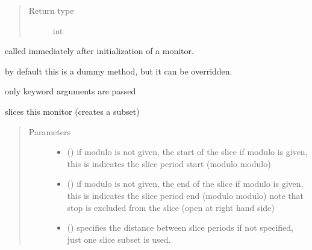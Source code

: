 \documentclass[letterpaper,10pt,english]{sphinxmanual}
\begin{document}
\begin{fulllineitems}
\begin{fulllineitems}
\begin{quote}
\begin{description}
\item[{Return type}] \leavevmode
int

\end{description}\end{quote}

\end{fulllineitems}


\begin{fulllineitems}
\label{\detokenize{Reference:salabim.Monitor.setup}}
called immediately after initialization of a monitor.

by default this is a dummy method, but it can be overridden.

only keyword arguments are passed

\end{fulllineitems}


\begin{fulllineitems}
\label{\detokenize{Reference:salabim.Monitor.slice}}
slices this monitor (creates a subset)
\begin{quote}\begin{description}
\item[{Parameters}] \leavevmode\begin{itemize}
\item {} 
 () \textendash{} if modulo is not given, the start of the slice 
if modulo is given, this is indicates the slice period start (modulo modulo)

\item {} 
 () \textendash{} if modulo is not given, the end of the slice 
if modulo is given, this is indicates the slice period end (modulo modulo) 
note that stop is excluded from the slice (open at right hand side)

\item {} 
 () \textendash{} specifies the distance between slice periods 
if not specified, just one slice subset is used.


\end{itemize}
\end{description}
\end{quote}
\end{fulllineitems}
\end{fulllineitems}
\end{document}
